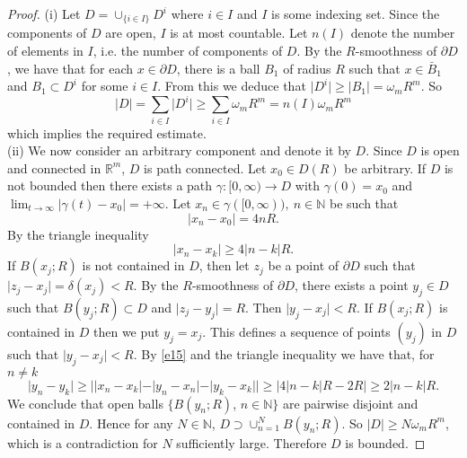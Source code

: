 \documentclass[a4paper,9pt]{amsart}
\begin{document}
\begin{proof}
\noindent (i) Let $D=\cup_{\{i \in I\}} D^{i}$ where $i \in I$ and $I$ is some
indexing set. Since the components of $D$ are open, $I$ is at most
countable. Let $n(I)$ denote the number of elements in $I$, i.e.
the number of components of $D$. By the $R$-smoothness of
$\partial D$, we have that for each $x \in \partial D$, there is a
ball $B_{1}$ of radius $R$ such that $x \in \bar{B}_{1}$ and
$B_{1} \subset D^{i}$ for some $i \in I$. From this we deduce that
$\vert D^{i} \vert \geq \vert B_{1} \vert =\omega_{m} R^{m}.$ So
\[\vert D \vert = \sum_{i \in I} \vert D^{i} \vert \geq \sum_{i \in I}\omega_{m} R^{m} = n(I)\omega_{m}R^{m}\]
which implies the required estimate.\\

\noindent (ii) We now consider an arbitrary component and denote it by $D$. Since
$D$ is open and connected in $\mathbb{R}^m$, $D$ is path
connected. Let $x_0\in D(R)$ be arbitrary. If $D$ is not bounded
then there exists a path $\gamma:[0,\infty)\rightarrow D$ with
$\gamma(0)=x_0$ and $\lim_{t\rightarrow \infty}\vert \gamma(t)-x_0
\vert = +\infty$. Let $x_n\in \gamma([0,\infty)),\ n\in {\mathbb{N}}$ be
such that
\begin{equation*}
\vert x_n - x_0 \vert= 4nR.
\end{equation*}
By the triangle inequality
\begin{equation}\label{e15}
\vert x_n-x_k \vert \geq 4\vert n-k \vert R.
\end{equation}
If $B(x_j;R)$ is not contained in $D$, then let $z_j$ be a point
of $\partial D$ such that $\vert z_j-x_j \vert = \delta(x_j) < R$.
By the $R$-smoothness of $\partial D$, there exists a point $y_j
\in D$ such that $B(y_j;R)\subset D$ and $\vert z_j - y_j \vert
=R$. Then $\vert y_j - x_j \vert <R$. If $B(x_j;R)$ is contained
in $D$ then we put $y_j=x_j$. This defines a sequence of points
$(y_j)$ in $D$ such that $\vert y_j - x_j \vert <R$. By
\eqref{e15} and the triangle inequality we have that, for $n \neq
k$
\begin{equation*}
\vert y_n - y_k\vert \geq \vert \vert x_n - x_k \vert - \vert y_n
- x_n \vert- \vert y_k - x_k\vert \vert \geq \vert 4 \vert n-k \vert
R-2R \vert \geq 2 \vert n-k \vert R.
\end{equation*}
We conclude that open balls $\{B(y_n;R)$, $n\in \mathbb{N}\}$ are pairwise
disjoint and contained in $D$. Hence for any $N\in \mathbb{N}$,
$D\supset\cup_{n=1}^NB(y_n;R)$. So $\vert D \vert \geq N\omega_{m}R^m$, which is
a contradiction for $N$ sufficiently large. Therefore $D$ is bounded.


\end{proof}
\end{document}
